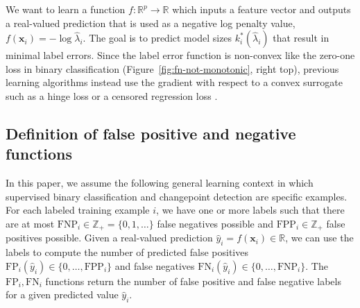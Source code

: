 \documentclass{article}
\begin{document}
We want to learn a function $f:\mathbb R^p\rightarrow \mathbb R$ which inputs a feature vector and outputs a real-valued prediction that is used as a negative log penalty value, $f(\mathbf x_i) = -\log \hat \lambda_i$.
The goal is to predict model sizes $k^*_i(\hat \lambda_i)$ that result in minimal label errors. 
Since the label error function is non-convex like the zero-one loss in binary classification (Figure~\ref{fig:fn-not-monotonic}, right top), previous learning algorithms instead use the gradient with respect to a convex surrogate such as a hinge loss \citep{Hocking2013icml,Drouin2017} or a censored regression loss \citep{barnwal2021aftxgboost}.

\subsection{Definition of false positive and negative functions}
\label{sec:def-fp-fn}

In this paper, we assume the following general learning context in which supervised binary classification and changepoint detection are specific examples. 
For each labeled training example $i$, we have one or more labels such that there are at most $\text{FNP}_i\in\mathbb Z_+=\{0, 1, \dots\}$  false negatives possible and $\text{FPP}_i\in\mathbb Z_+$ false positives possible.
Given a real-valued prediction $\hat y_i=f(\mathbf x_i)\in\mathbb R$, we can use the labels to compute the number of predicted false positives $\text{FP}_i(\hat y_i)\in \{0, \dots, \text{FPP}_i\}$ and false negatives $\text{FN}_i(\hat y_i)\in\{0, \dots, \text{FNP}_i\}$.
The $\text{FP}_i,\text{FN}_i$ functions return the number of false positive and false negative labels for a given predicted value $\hat y_i$. 
\end{document}

